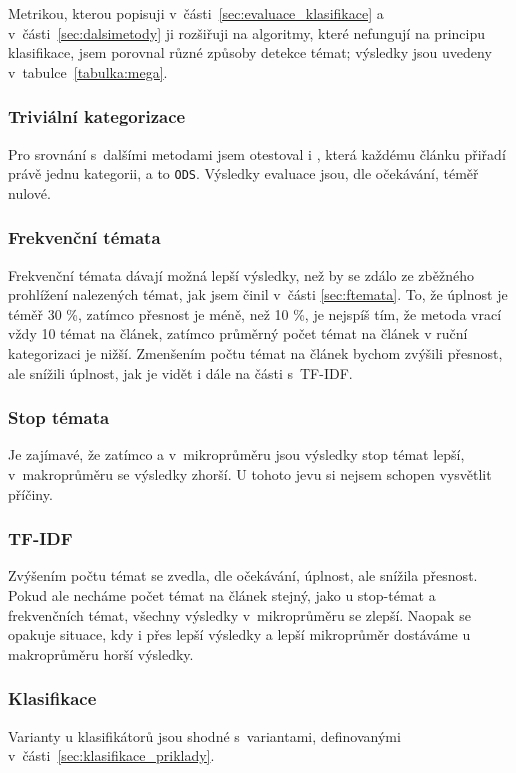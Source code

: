 \documentclass[12pt,a4paper]{report}
\begin{document}
Metrikou, kterou popisuji v~části~\ref{sec:evaluace_klasifikace} a v~části~\ref{sec:dalsimetody} ji rozšiřuji na algoritmy, které nefungují na principu klasifikace, jsem porovnal různé způsoby detekce témat; výsledky jsou uvedeny v~tabulce~\ref{tabulka:mega}.

\subsubsection{Triviální kategorizace}
Pro srovnání s~dalšími metodami jsem otestoval i , která každému článku přiřadí právě jednu kategorii, a to \texttt{ODS}. Výsledky evaluace jsou, dle očekávání, téměř nulové.

\subsubsection{Frekvenční témata}
Frekvenční témata dávají možná lepší výsledky, než by se zdálo ze zběžného prohlížení nalezených témat, jak jsem činil v~části \ref{sec:ftemata}. To, že úplnost je téměř 30 \%, zatímco přesnost je méně, než 10 \%, je nejspíš tím, že metoda vrací vždy 10 témat na článek, zatímco průměrný počet témat na článek v ruční kategorizaci je nižší. Zmenšením počtu témat na článek bychom zvýšili přesnost, ale snížili úplnost, jak je vidět i dále na části s~TF-IDF.

\subsubsection{Stop témata}
Je zajímavé, že zatímco  a v~mikroprůměru jsou výsledky stop témat lepší, v~makroprůměru se výsledky zhorší. U tohoto jevu si nejsem schopen vysvětlit příčiny.

\subsubsection{TF-IDF}
Zvýšením počtu témat se zvedla, dle očekávání, úplnost, ale snížila přesnost. Pokud ale necháme počet témat na článek stejný, jako u stop-témat a frekvenčních témat, všechny výsledky v~mikroprůměru se zlepší. Naopak se opakuje situace, kdy i přes  lepší výsledky a lepší mikroprůměr dostáváme u makroprůměru horší výsledky.

\subsubsection{Klasifikace}
Varianty u klasifikátorů jsou shodné s~variantami, definovanými v~části~\ref{sec:klasifikace_priklady}. 
\end{document}
